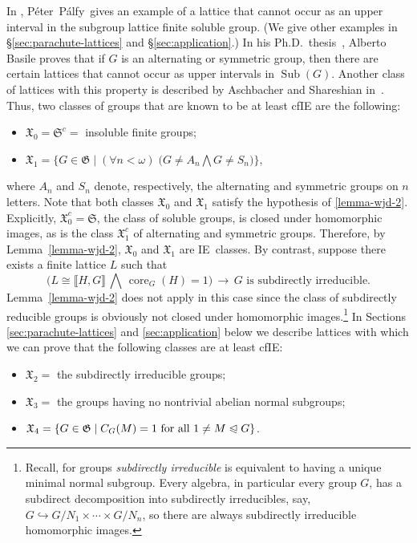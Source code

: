 \documentclass{gen-j-l}
\newcommand{\lb}{\ensuremath{\llbracket}}
\newcommand{\rb}{\ensuremath{\rrbracket}}
\newcommand{\<}{\ensuremath{\langle}}
\renewcommand{\>}{\ensuremath{\rangle}}
\theoremstyle{plain}
\theoremstyle{definition}
\theoremstyle{remark}
\numberwithin{theorem}{section}
\numberwithin{claim}{section}
\numberwithin{equation}{section}
\numberwithin{conjecture}{section}
\newcommand{\Peter}{P{\'e}ter}
\newcommand{\Palfy}{P\'alfy}
\newcommand{\defn}[1]{\emph{#1}}
\newcommand{\subnormal}{\ensuremath{\trianglelefteqslant}}
\newcommand{\Meet}{\ensuremath{\bigwedge}}
\newcommand{\Sub}{\ensuremath{\operatorname{Sub}}}
\newcommand{\core}{\ensuremath{\operatorname{core}}}
\newcommand{\2}{\ensuremath{\mathbf{2}}}
\newcommand{\3}{\ensuremath{\mathbf{3}}}
\newcommand{\sG}{\ensuremath{\mathfrak{X}}}
\newcommand{\G}{\ensuremath{\mathfrak{G}}}
\newcommand{\IE}{{\small IE}}
\begin{document}
In \cite{Palfy:1995}, \Peter\ \Palfy\ gives an example of a lattice that cannot occur as an
upper interval in the subgroup lattice finite soluble group.  (We give other examples
in \S\ref{sec:parachute-lattices} and \S\ref{sec:application}.)
In his Ph.D.~thesis~\cite{Basile:2001}, Alberto Basile proves that if
$G$ is an alternating or symmetric group, then there are certain lattices that
cannot occur as upper intervals in $\Sub(G)$. Another class of lattices with
this property is described by Aschbacher and Shareshian in~\cite{Aschbacher:2009}. 
Thus, two classes of groups that are known to be at least \acs{cfIE} are the following:
\begin{itemize}
\item $\sG_0 = \mathfrak{S}^c = $ insoluble finite groups;
\item $\sG_1 =\bigl\{G\in \G \mid (\forall n<\omega) \; \bigl(G \neq A_n \Meet  G\neq S_n\bigr) \bigr\}$,
\end{itemize}
where $A_n$ and $S_n$ denote, respectively,
the alternating and symmetric groups on
$n$ letters.
Note that both classes $\sG_0$ and $\sG_1$ satisfy the hypothesis of \ref{lemma-wjd-2}.
Explicitly, $\sG_0^c = \mathfrak{S}$, the class of soluble groups, is closed under homomorphic
images, as is the class $\sG_1^c$ of alternating and symmetric groups. 
Therefore, by Lemma~\ref{lemma-wjd-2}, $\sG_0$ and $\sG_1$ are \IE\ classes.
By contrast, suppose %
there exists a finite lattice $L$ such that
 \[
 \bigl(L \cong \lb H, G \rb \,\Meet\, \core_G(H)=1\bigr) \, \longrightarrow \, G
 \text{ is subdirectly irreducible.}  %
\]
Lemma~\ref{lemma-wjd-2} does not apply in this case since the class of
subdirectly reducible groups is obviously not closed under homomorphic 
images.\footnote{Recall, for groups \defn{subdirectly irreducible} is equivalent
  to having a unique minimal normal subgroup.
 Every algebra, in particular every group $G$, has a subdirect
  decomposition into subdirectly irreducibles, say, $G\hookrightarrow G/N_1 \times \cdots\times
  G/N_n$, so there are always  subdirectly irreducible homomorphic images.}
In Sections \ref{sec:parachute-lattices} and \ref{sec:application} below we describe
lattices with which we can prove that the following classes are at least 
\acs{cfIE}: 
\begin{itemize}
\item $\sG_2 = $ the subdirectly irreducible groups;
\item $\sG_3 = $ the groups having no nontrivial abelian normal subgroups;
\item $\sG_4 = \{G\in \G \mid C_G(M) = 1 \text{ for all } 1\neq M\subnormal G\}$.
\end{itemize}
\end{document}
